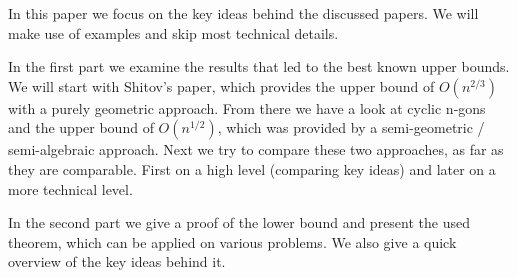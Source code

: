 In this paper we focus on the key ideas behind the discussed papers. We will make use of examples and skip most technical details.

In the first part we examine the results that led to the best known upper bounds. 
We will start with Shitov's paper, which provides the upper bound of $O(n^{2/3})$ with a purely geometric approach.
From there we have a look at cyclic n-gons and the upper bound of $O(n^{1/2})$, which was provided by a semi-geometric / semi-algebraic approach.
Next we try to compare these two approaches, as far as they are comparable. First on a high level (comparing key ideas) and later on a more technical level.

In the second part we give a proof of the lower bound and present the used theorem, which can be applied on various problems. We also give a quick overview of the key ideas behind it.
